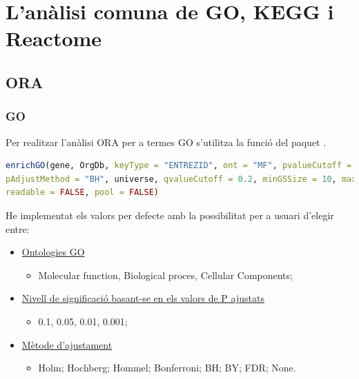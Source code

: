\documentclass[]{article}
\begin{document}
\section{L'anàlisi comuna de GO, KEGG i Reactome}

\subsection{ORA}

\subsubsection{GO}

Per realitzar l'anàlisi ORA per a termes GO s'utilitza la funció  del paquet .
\begin{lstlisting}[language=R]
enrichGO(gene, OrgDb, keyType = "ENTREZID", ont = "MF", pvalueCutoff = 0.05, 
pAdjustMethod = "BH", universe, qvalueCutoff = 0.2, minGSSize = 10, maxGSSize = 500, 
readable = FALSE, pool = FALSE)
\end{lstlisting}

He implementat els valors per defecte amb la possibilitat per a usuari d'elegir entre:

\begin{itemize}
\item \underline{Ontologies GO} 
\begin{itemize}
\item Molecular function, Biological proces, Cellular Components;
\end{itemize}
\item \underline{Nivell de significació basant-se en els valors de P ajustats}
\begin{itemize}
\item 0.1, 0.05, 0.01, 0.001;
\end{itemize}
\item \underline{Mètode d'ajustament}
\begin{itemize}
\item Holm; Hochberg; Hommel; Bonferroni; BH; BY; FDR; None.
\end{itemize}
\end{itemize}
\end{document}
